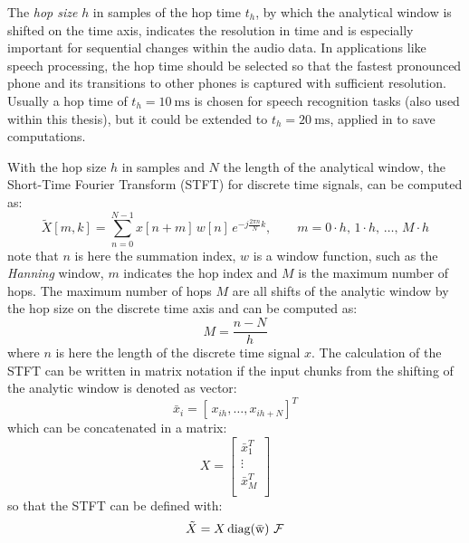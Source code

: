 The \emph{hop size} $h$ in samples of the hop time $t_h$, by which the analytical window is shifted on the time axis, indicates the resolution in time and is especially important for sequential changes within the audio data.
In applications like speech processing, the hop time should be selected so that the fastest pronounced phone and its transitions to other phones is captured with sufficient resolution.
Usually a hop time of $t_{h}=\SI{10}{\milli\second}$ is chosen for speech recognition tasks (also used within this thesis), but it could be extended to $t_{h}=\SI{20}{\milli\second}$, applied in \cite{Peter2020} to save computations.

With the hop size $h$ in samples and $N$ the length of the analytical window, the Short-Time Fourier Transform (STFT) for discrete time signals, can be computed as:
\begin{equation}\label{eq:signal_spec_stft}
    \tilde{X}[m, k] = \sum_{n=0}^{N-1} x[n + m] \, w[n] \, e^{-j\frac{2 \pi n}{N}k}, \qquad m = 0 \cdot h, \, 1 \cdot h, \, \dots, \, M \cdot h 
\end{equation}
note that $n$ is here the summation index, $w$ is a window function, such as the \emph{Hanning} window, $m$ indicates the hop index and $M$ is the maximum number of hops.
The maximum number of hops $M$ are all shifts of the analytic window by the hop size on the discrete time axis and can be computed as:
\begin{equation}\label{eq:signal_spec_hop}
  M = \frac{n-N}{h}
\end{equation}
where $n$ is here the length of the discrete time signal $x$.
The calculation of the STFT can be written in matrix notation if the input chunks from the shifting of the analytic window is denoted as vector:
\begin{equation}
  \bar{x}_i = [\, x_{ih}, \dots, x_{ih+N}]^T
\end{equation}
which can be concatenated in a matrix:
\begin{equation}
  X = 
  \begin{bmatrix}
    \bar{x}_1^T \\
    \vdots\\
    \bar{x}_M^T \\
  \end{bmatrix}
\end{equation}
so that the STFT can be defined with:
\begin{equation}\label{eq:signal_spec_stft_matrix}
  \tilde{X} = X \, \mathrm{diag(\bar{w})\,} \, \mathcal{F}
\end{equation}
